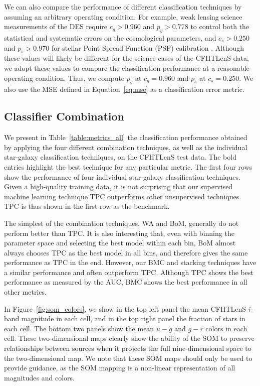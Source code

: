 We can also compare the performance of different classification techniques
by assuming an arbitrary operating condition.
For example, weak lensing science measurements
of the DES require $c_g > 0.960$ and $p_g > 0.778$
to control both the statistical and systematic errors
on the cosmological parameters,
and $c_s > 0.250$ and $p_s > 0.970$
for stellar Point Spread Function (PSF) calibration
\citep{soumagnac2015star}.
Although these values will likely be different
for the science cases of the CFHTLenS data,
we adopt these values to compare the classification performance
at a reasonable operating condition.
Thus, we compute $p_{g}$ at $c_g=0.960$
and $p_{s}$ at $c_s=0.250$.
We also use the MSE defined in Equation~\ref{eq:mse}
as a classification error metric.


\subsection{Classifier Combination}
  \label{section:rich_training}

We present in Table~\ref{table:metrics_all}
the classification performance obtained by
applying the four different combination techniques,
as well as the individual star-galaxy classification techniques,
on the CFHTLenS test data.
The bold entries highlight the best technique for any particular metric.
The first four rows show the performance of four individual star-galaxy
classification techniques.
Given a high-quality training data, it is not surprising that 
our supervised machine learning technique TPC
outperforms other unsupervised techniques.
TPC is thus shown in the first row as the benchmark.

The simplest of the combination techniques, WA and BoM,
generally do not perform better than TPC.
It is also interesting that,
even with binning the parameter space and selecting the best model
within each bin,
BoM almost always chooses TPC as the best model in all bins,
and therefore gives the same performance as TPC in the end.
However, our BMC and stacking techniques have a similar performance
and often outperform TPC.
Although TPC shows the best performance as measured by the AUC,
BMC shows the best performance in all other metrics.

In Figure~\ref{fig:som_colors}, we show in the top left panel
the mean CFHTLenS $i$-band magnitude in each cell,
and in the top right panel the fraction of stars in each cell.
The bottom two panels show the mean $u-g$ and  $g-r$ colors in each cell.
These two-dimensional maps clearly show
the ability of the SOM to preserve relationships between sources
when it projects the full nine-dimensional space to the two-dimensional map.
We note that these SOM maps should only be used to provide guidance,
as the SOM mapping is a non-linear representation of all magnitudes and colors.

